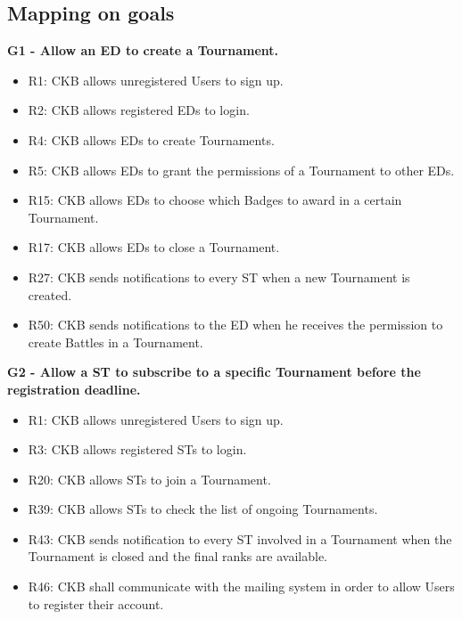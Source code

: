 \newpage

\subsection{Mapping on goals}
\label{subsec:mapping_on_goals}%
\textbf{G1 - Allow an ED to create a Tournament.}
\begin{itemize}
    \item R1: CKB allows unregistered Users to sign up.
    \item R2: CKB allows registered EDs to login.
    \item R4: CKB allows EDs to create Tournaments.
    \item R5: CKB allows EDs to grant the permissions of a Tournament to other EDs.
    \item R15: CKB allows EDs to choose which Badges to award in a certain Tournament.
    \item R17: CKB allows EDs to close a Tournament.
    \item R27: CKB sends notifications to every ST when a new Tournament is created.
    \item R50: CKB sends notifications to the ED when he receives the permission to create Battles in a Tournament.
\end{itemize}

\vspace{1.5cm}
\textbf{G2 - Allow a ST to subscribe to a specific Tournament before the registration deadline.}
\begin{itemize}
    \item R1: CKB allows unregistered Users to sign up.
    \item R3: CKB allows registered STs to login.
    \item R20: CKB allows STs to join a Tournament.
    \item R39: CKB allows STs to check the list of ongoing Tournaments.
    \item R43: CKB sends notification to every ST involved in a Tournament when the Tournament is closed and the final ranks are available.
    \item R46: CKB shall communicate with the mailing system in order to allow Users to register their account.
\end{itemize}



